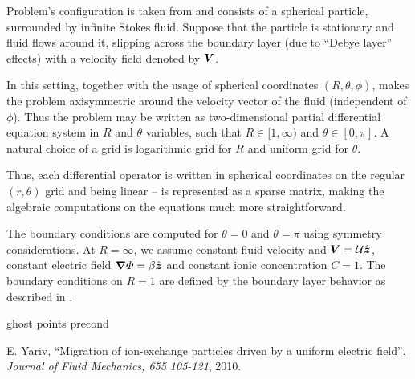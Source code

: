 \documentclass[11pt]{article}
\begin{document}
Problem's configuration is taken from \cite{Yariv10} and
consists of a spherical particle, surrounded by infinite Stokes fluid.
Suppose that the particle is stationary and fluid flows around it, slipping across
the boundary layer (due to ``Debye layer'' effects) with a velocity field denoted
by $\boldsymbol{V}$.

In this setting, together with the usage of spherical coordinates $(R,\theta,\phi)$,
makes the problem axisymmetric around the velocity vector of the fluid (independent
of $\phi$). Thus the problem may be written as two-dimensional partial
differential equation system in $R$ and $\theta$ variables,
such that $R \in [1,\infty)$ and $\theta \in [0, \pi]$.
A natural choice of a grid is logarithmic grid for $R$ and uniform grid for $\theta$.

Thus, each differential operator is written in spherical coordinates on the regular
$(r, \theta)$ grid and being linear -- is represented as a sparse matrix,
making the algebraic computations on the equations much more straightforward.

The boundary conditions are computed for $\theta = 0$ and $\theta = \pi$ using symmetry
considerations. At $R = \infty$, we assume constant fluid velocity
and $\boldsymbol{V} = \cal{U} \hat{\boldsymbol{z}}$, constant electric field $\boldsymbol{\nabla} \varPhi = \beta \hat{\boldsymbol{z}}$
and constant ionic concentration $C = 1$.
The boundary conditions on $R = 1$ are defined by the boundary layer behavior as described
in \cite{Yariv10}.

ghost points
precond


\begin{thebibliography}{}

 E. Yariv, 
``Migration of ion-exchange particles driven by a uniform electric field'',
{\em Journal of Fluid Mechanics, 655 105-121}, 2010.

\end{thebibliography}
\end{document}
